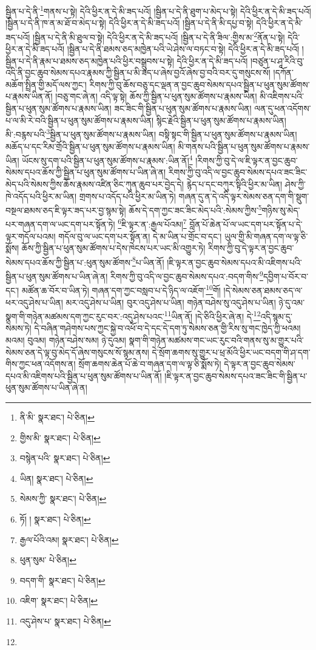 སྦྱིན་པ་དེ་ནི་\footnote{ནི་མི་  སྣར་ཐང་།  པེ་ཅིན། }གནས་པ་སྟེ། དེའི་ཕྱིར་ན་དེ་མི་ཟད་པའོ། །སྦྱིན་པ་དེ་ནི་ཐུག་པ་མེད་པ་སྟེ། དེའི་ཕྱིར་ན་དེ་མི་ཟད་པའོ། །སྦྱིན་པ་དེ་ནི་ཁ་ན་མ་ཐོ་བ་མེད་པ་སྟེ། དེའི་ཕྱིར་ན་དེ་མི་ཟད་པའོ། །སྦྱིན་པ་དེ་ནི་མི་དཔྱ་བ་སྟེ། དེའི་ཕྱིར་ན་དེ་མི་ཟད་པའོ། །སྦྱིན་པ་དེ་ནི་མི་ཐུལ་བ་སྟེ། དེའི་ཕྱིར་ན་དེ་མི་ཟད་པའོ། །སྦྱིན་པ་དེ་ནི་ཟིལ་:གྱིས་མ་\footnote{གྱིས་མི་  སྣར་ཐང་།  པེ་ཅིན། }ནོན་པ་སྟེ། དེའི་ཕྱིར་ན་དེ་མི་ཟད་པའོ། །སྦྱིན་པ་དེ་ནི་ཐམས་ཅད་མཁྱེན་པའི་ཡེ་ཤེས་ལ་བཏང་བ་སྟེ། དེའི་ཕྱིར་ན་དེ་མི་ཟད་པའོ། །སྦྱིན་པ་དེ་ནི་རྣམ་པ་ཐམས་ཅད་མཁྱེན་པའི་ཕྱིར་བསྒྲུབས་པ་སྟེ། དེའི་ཕྱིར་ན་དེ་མི་ཟད་པའོ། །བཙུན་པ་ཤཱ་རིའི་བུ་འདི་ནི་བྱང་ཆུབ་སེམས་དཔའ་རྣམས་ཀྱི་སྦྱིན་པ་མི་ཟད་པ་ཞེས་བྱའོ་ཞེས་བྱ་བའི་བར་དུ་གསུངས་སོ། །དཀོན་མཆོག་སྤྲིན་གྱི་མདོ་ལས་ཀྱང་། རིགས་ཀྱི་བུ་ཆོས་བཅུ་དང་ལྡན་ན་བྱང་ཆུབ་སེམས་དཔའ་སྦྱིན་པ་ཕུན་སུམ་ཚོགས་པ་རྣམས་ཡིན་ནོ། །བཅུ་གང་ཞེ་ན། འདི་ལྟ་སྟེ། ཆོས་ཀྱི་སྦྱིན་པ་ཕུན་སུམ་ཚོགས་པ་རྣམས་ཡིན། མི་འཇིགས་པའི་སྦྱིན་པ་ཕུན་སུམ་ཚོགས་པ་རྣམས་ཡིན། ཟང་ཟིང་གི་སྦྱིན་པ་ཕུན་སུམ་ཚོགས་པ་རྣམས་ཡིན། ལན་དུ་ཕན་འདོགས་པ་ལ་མི་རེ་བའི་སྦྱིན་པ་ཕུན་སུམ་ཚོགས་པ་རྣམས་ཡིན། སྙིང་རྗེའི་སྦྱིན་པ་ཕུན་སུམ་ཚོགས་པ་རྣམས་ཡིན། མི་:བརྙས་པའི་\footnote{བསྙེན་པའི་  སྣར་ཐང་།  པེ་ཅིན། }སྦྱིན་པ་ཕུན་སུམ་ཚོགས་པ་རྣམས་ཡིན། བསྟི་སྟང་གི་སྦྱིན་པ་ཕུན་སུམ་ཚོགས་པ་རྣམས་ཡིན། མཆོད་པ་དང་རིམ་གྲོའི་སྦྱིན་པ་ཕུན་སུམ་ཚོགས་པ་རྣམས་ཡིན། མི་གནས་པའི་སྦྱིན་པ་ཕུན་སུམ་ཚོགས་པ་རྣམས་ཡིན། ཡོངས་སུ་དག་པའི་སྦྱིན་པ་ཕུན་སུམ་ཚོགས་པ་རྣམས་:ཡིན་ནོ།\footnote{ཡིན།  སྣར་ཐང་།  པེ་ཅིན། } །རིགས་ཀྱི་བུ་དེ་ལ་ཇི་ལྟར་ན་བྱང་ཆུབ་སེམས་དཔའ་ཆོས་ཀྱི་སྦྱིན་པ་ཕུན་སུམ་ཚོགས་པ་ཡིན་ཞེ་ན། རིགས་ཀྱི་བུ་འདི་ལ་བྱང་ཆུབ་སེམས་དཔའ་ཟང་ཟིང་མེད་པའི་སེམས་ཀྱིས་ཆོས་རྣམས་འཛིན་ཅིང་ཀུན་ཆུབ་པར་བྱེད་དེ། རྙེད་པ་དང་བཀུར་སྟིའི་ཕྱིར་མ་ཡིན། ཤེས་ཀྱི་ཁེ་འདོད་པའི་ཕྱིར་མ་ཡིན། གྲགས་པ་འདོད་པའི་ཕྱིར་མ་ཡིན་ཏེ། གཞན་དུ་ན་དེ་འདི་ལྟར་སེམས་ཅན་དག་གི་སྡུག་བསྔལ་ཐམས་ཅད་ཇི་ལྟར་ཟད་པར་བྱ་སྙམ་སྟེ། ཆོས་དེ་དག་ཀྱང་ཟང་ཟིང་མེད་པའི་:སེམས་ཀྱིས་\footnote{སེམས་ཀྱི་  སྣར་ཐང་།  པེ་ཅིན། }གཉིས་སུ་མེད་པར་གཞན་དག་ལ་ཡང་དག་པར་སྟོན་ཏེ། \footnote{ཏོ། །   སྣར་ཐང་།  པེ་ཅིན། }ཇི་ལྟར་ན་:རྒྱལ་པོའམ།\footnote{རྒྱལ་པོའི་འམ།  སྣར་ཐང་།  པེ་ཅིན། } བློན་པོ་ཆེན་པོ་ལ་ཡང་དག་པར་སྟོན་པ་དེ་ལྟར་གདོལ་པའམ། གདོལ་བུ་ལ་ཡང་དག་པར་སྟོན་ན། དེ་མ་ཡིན་པ་གྲོང་བ་དང་། ཡུལ་གྱི་མི་གཞན་དག་ལ་ལྟ་ཅི་སྨོས། ཆོས་ཀྱི་སྦྱིན་པ་ཕུན་སུམ་ཚོགས་པ་དེས་ཁེངས་པར་ཡང་མི་འགྱུར་ཏེ། རིགས་ཀྱི་བུ་དེ་ལྟར་ན་བྱང་ཆུབ་སེམས་དཔའ་ཆོས་ཀྱི་སྦྱིན་པ་:ཕུན་སུམ་ཚོགས་\footnote{ཕུན་སུམ་  པེ་ཅིན། }པ་ཡིན་ནོ། །ཇི་ལྟར་ན་བྱང་ཆུབ་སེམས་དཔའ་མི་འཇིགས་པའི་སྦྱིན་པ་ཕུན་སུམ་ཚོགས་པ་ཡིན་ཞེ་ན། རིགས་ཀྱི་བུ་འདི་ལ་བྱང་ཆུབ་སེམས་དཔའ་:བདག་གིས་\footnote{བདག་གི་  སྣར་ཐང་།  པེ་ཅིན། }དབྱིག་པ་བོར་བ་དང་། མཚོན་ཆ་བོར་བ་ཡིན་ཏེ། གཞན་དག་ཀྱང་བསླབ་པ་དེ་ཉིད་ལ་འཇོག་\footnote{འཇིག་  སྣར་ཐང་།  པེ་ཅིན། }གོ། །དེ་སེམས་ཅན་ཐམས་ཅད་ལ་ཕར་འདུ་ཤེས་པ་ཡིན། མར་འདུ་ཤེས་པ་ཡིན། བུར་འདུ་ཤེས་པ་ཡིན། གཉེན་བཤེས་སུ་འདུ་ཤེས་པ་ཡིན། ཉེ་དུ་འམ་སྣག་གི་གཉེན་མཚམས་དག་ཀྱང་རུང་བར་:འདུ་ཤེས་པའང་\footnote{འདུ་ཤེས་པ་  སྣར་ཐང་།  པེ་ཅིན། }ཡིན་ནོ། །དེ་ཅིའི་ཕྱིར་ཞེ་ན། དེ་\footnote{}འདི་སྙམ་དུ་སེམས་ཏེ། དེ་བཞིན་གཤེགས་པས་ཀྱང་སྐྱེ་བ་འཕོ་བ་དེ་དང་དེ་དག་ཏུ་སེམས་ཅན་གྱི་རིས་སུ་གང་ཁྱེད་ཀྱི་ཕའམ། མའམ། བུའམ། གཉེན་བཤེས་སམ། ཉེ་དུའམ། སྣག་གི་གཉེན་མཚམས་གང་ཡང་རུང་བའི་གནས་སུ་མ་གྱུར་པའི་སེམས་ཅན་དེ་ལྟ་བུ་མེད་དོ་ཞེས་གསུངས་སོ་སྙམ་ནས། དེ་སྲོག་ཆགས་སུ་གྱུར་པ་ཕྲ་མོའི་ཕྱིར་ཡང་བདག་གི་ཤ་དག་གིས་ཀྱང་ཕན་འདོགས་ན། སྲོག་ཆགས་ཆེན་པོ་ཆེ་བ་གཞན་དག་ལ་ལྟ་ཅི་སྨོས་ཏེ། དེ་ལྟར་ན་བྱང་ཆུབ་སེམས་དཔའ་མི་འཇིགས་པའི་སྦྱིན་པ་ཕུན་སུམ་ཚོགས་པ་ཡིན་ནོ། །ཇི་ལྟར་ན་བྱང་ཆུབ་སེམས་དཔའ་ཟང་ཟིང་གི་སྦྱིན་པ་ཕུན་སུམ་ཚོགས་པ་ཡིན་ཞེ་ན། 